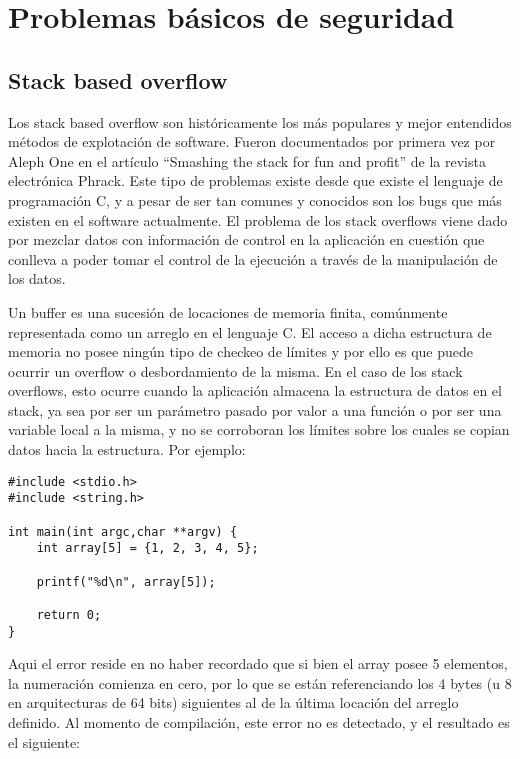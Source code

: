 \chapter{Problemas b\'asicos de seguridad}
	\label{cap:problemas_basicos}
\section{Stack based overflow}
	\label{sec:stackbof}

Los stack based overflow son hist\'oricamente los m\'as populares y mejor entendidos m\'etodos de explotaci\'on de software. Fueron documentados por primera vez por Aleph One en el art\'iculo ``Smashing the stack for fun and profit'' de la revista electr\'onica Phrack. Este tipo de problemas existe desde que existe el lenguaje de programaci\'on C, y a pesar de ser tan comunes y conocidos son los bugs que m\'as existen en el software actualmente. El problema de los stack overflows viene dado por mezclar datos con informaci\'on de control en la aplicaci\'on en cuesti\'on que conlleva a poder tomar el control de la ejecuci\'on a trav\'es de la manipulaci\'on de los datos.

Un buffer es una sucesi\'on de locaciones de memoria finita, com\'unmente representada como un arreglo en el lenguaje C. El acceso a dicha estructura de memoria no posee ning\'un tipo de checkeo de l\'imites y por ello es que puede ocurrir un overflow o desbordamiento de la misma. En el caso de los stack overflows, esto ocurre cuando la aplicaci\'on almacena la estructura de datos en el stack, ya sea por ser un par\'ametro pasado por valor a una funci\'on o por ser una variable local a la misma, y no se corroboran los l\'imites sobre los cuales se copian datos hacia la estructura. Por ejemplo:

	\vspace{5 mm}
	
\begin{lstlisting}
#include <stdio.h>
#include <string.h>

int main(int argc,char **argv) {
	int array[5] = {1, 2, 3, 4, 5};
	
	printf("%d\n", array[5]);
	
	return 0;
}
\end{lstlisting}

	\vspace{5 mm}
	
Aqui el error reside en no haber recordado que si bien el array posee 5 elementos, la numeraci\'on comienza en cero, por lo que se est\'an referenciando los 4 bytes (u 8 en arquitecturas de 64 bits) siguientes al de la \'ultima locaci\'on del arreglo definido. Al momento de compilaci\'on, este error no es detectado, y el resultado es el siguiente:

